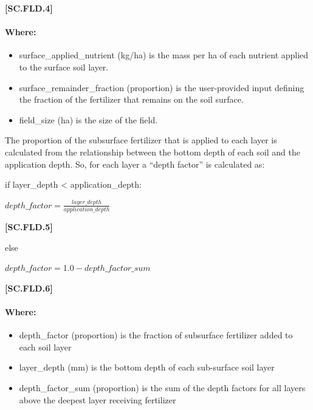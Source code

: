             {\raggedleft \textbf{[SC.FLD.4]}\par}
            \vspace{0.5cm} 

\paragraph{Where:}
\begin{itemize}
    \item surface\_applied\_nutrient (kg/ha) is the mass per ha of each nutrient applied to the surface soil layer.
    \item surface\_remainder\_fraction (proportion) is the user-provided input defining the fraction of the fertilizer that remains on the soil surface.
    \item field\_size (ha) is the size of the field.
\end{itemize}

The proportion of the subsurface fertilizer that is applied to each layer is calculated from the relationship between the bottom depth of each soil and the application depth. So, for each layer a “depth factor” is calculated as:
\vspace{0.2cm}

if layer\_depth < application\_depth:
            \vspace{0.5cm} 
    
    \begin{center}
        \(depth\_factor=\frac{layer\_depth}{application\_depth} \)
    \end{center}
        \vspace{0.5cm} 
    
            {\raggedleft \textbf{[SC.FLD.5]}\par}
            \vspace{0.5cm} 
else
            \vspace{0.5cm} 
    
    \begin{center}
        \(depth\_factor=1.0-depth\_factor\_sum\)
    \end{center}
        \vspace{0.5cm} 
    
            {\raggedleft \textbf{[SC.FLD.6]}\par}
            \vspace{0.5cm} 

\paragraph{Where:}
\begin{itemize}
    \item depth\_factor (proportion) is the fraction of subsurface fertilizer added to each soil layer
    \item layer\_depth (mm) is the bottom depth of each sub-surface soil layer
    \item depth\_factor\_sum (proportion) is the sum of the depth factors for all layers above the deepest layer receiving fertilizer
\end{itemize}

